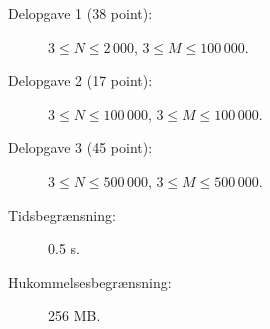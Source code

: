 \documentclass{boi2014-dk}
\begin{document}
    \Scoring

    \begin{description}
        \item[Delopgave 1 (38 point):] $3 \le N \le 2\,000$, $3 \le M \le 100\,000$.
        \item[Delopgave 2 (17 point):] $3 \le N \le 100\,000$, $3 \le M \le
            100\,000$.
        \item[Delopgave 3 (45 point):] $3 \le N \le 500\,000$, $3 \le M \le
            500\,000$.
    \end{description}

    \Constraints

    \begin{description}
        \item[Tidsbegrænsning:] 0.5 s.
        \item[Hukommelsesbegrænsning:] 256 MB.
    \end{description}
\end{document}
